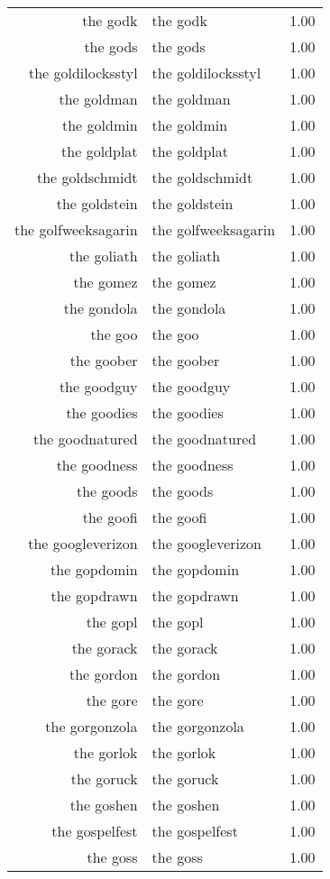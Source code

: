 \begin{table}[ht]
\begin{tabular}{rlr}
  the godk & the godk & 1.00 \\ 
  the gods & the gods & 1.00 \\ 
  the goldilocksstyl & the goldilocksstyl & 1.00 \\ 
  the goldman & the goldman & 1.00 \\ 
  the goldmin & the goldmin & 1.00 \\ 
  the goldplat & the goldplat & 1.00 \\ 
  the goldschmidt & the goldschmidt & 1.00 \\ 
  the goldstein & the goldstein & 1.00 \\ 
  the golfweeksagarin & the golfweeksagarin & 1.00 \\ 
  the goliath & the goliath & 1.00 \\ 
  the gomez & the gomez & 1.00 \\ 
  the gondola & the gondola & 1.00 \\ 
  the goo & the goo & 1.00 \\ 
  the goober & the goober & 1.00 \\ 
  the goodguy & the goodguy & 1.00 \\ 
  the goodies & the goodies & 1.00 \\ 
  the goodnatured & the goodnatured & 1.00 \\ 
  the goodness & the goodness & 1.00 \\ 
  the goods & the goods & 1.00 \\ 
  the goofi & the goofi & 1.00 \\ 
  the googleverizon & the googleverizon & 1.00 \\ 
  the gopdomin & the gopdomin & 1.00 \\ 
  the gopdrawn & the gopdrawn & 1.00 \\ 
  the gopl & the gopl & 1.00 \\ 
  the gorack & the gorack & 1.00 \\ 
  the gordon & the gordon & 1.00 \\ 
  the gore & the gore & 1.00 \\ 
  the gorgonzola & the gorgonzola & 1.00 \\ 
  the gorlok & the gorlok & 1.00 \\ 
  the goruck & the goruck & 1.00 \\ 
  the goshen & the goshen & 1.00 \\ 
  the gospelfest & the gospelfest & 1.00 \\ 
  the goss & the goss & 1.00 \\ 

\end{tabular}
\end{table}
